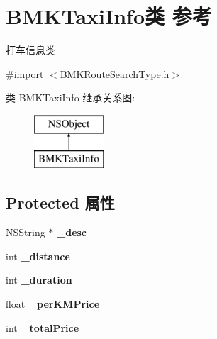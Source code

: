 \hypertarget{interface_b_m_k_taxi_info}{\section{B\+M\+K\+Taxi\+Info类 参考}
\label{interface_b_m_k_taxi_info}
}


打车信息类  




{\ttfamily \#import $<$B\+M\+K\+Route\+Search\+Type.\+h$>$}

类 B\+M\+K\+Taxi\+Info 继承关系图\+:\begin{figure}[H]
\begin{center}
\leavevmode
\includegraphics[height=2.000000cm]{interface_b_m_k_taxi_info}
\end{center}
\end{figure}
\subsection*{Protected 属性}
\begin{DoxyCompactItemize}
\item 
\hypertarget{interface_b_m_k_taxi_info_a31a15f90f1d7d94ebe866dadc826275e}{N\+S\+String $\ast$ {\bfseries \+\_\+desc}}\label{interface_b_m_k_taxi_info_a31a15f90f1d7d94ebe866dadc826275e}

\item 
\hypertarget{interface_b_m_k_taxi_info_a034a523b6e5c546466efd26bf4d62327}{int {\bfseries \+\_\+distance}}\label{interface_b_m_k_taxi_info_a034a523b6e5c546466efd26bf4d62327}

\item 
\hypertarget{interface_b_m_k_taxi_info_a4c0577d1da6086b7ac19193476a83a45}{int {\bfseries \+\_\+duration}}\label{interface_b_m_k_taxi_info_a4c0577d1da6086b7ac19193476a83a45}

\item 
\hypertarget{interface_b_m_k_taxi_info_a6dbca9a1eb364b633b94ae7d58399a0b}{float {\bfseries \+\_\+per\+K\+M\+Price}}\label{interface_b_m_k_taxi_info_a6dbca9a1eb364b633b94ae7d58399a0b}

\item 
\hypertarget{interface_b_m_k_taxi_info_aed1f43a63f7121e98683b665fa7a6f6f}{int {\bfseries \+\_\+total\+Price}}\label{interface_b_m_k_taxi_info_aed1f43a63f7121e98683b665fa7a6f6f}

\end{DoxyCompactItemize}
